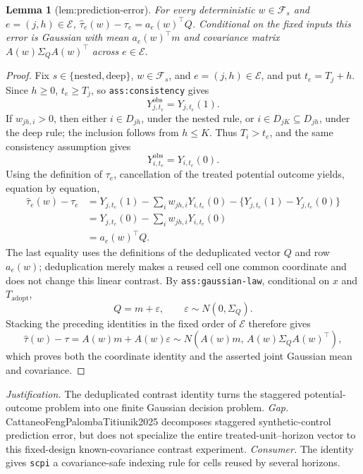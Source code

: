 \documentclass{article}
\newtheorem{lemma}{Lemma}
\begin{document}
\begin{lemma}[lem:prediction-error]\label{lem:prediction-error}
For every deterministic \(w\in\mathcal F_s\) and \(e=(j,h)\in\mathcal E\), \(\widehat\tau_e(w)-\tau_e=a_e(w)^{\top}Q\). Conditional on the fixed inputs this error is Gaussian with mean \(a_e(w)^{\top}m\) and covariance matrix \(A(w)\Sigma_QA(w)^{\top}\) across \(e\in\mathcal E\).
\end{lemma}
\begin{proof}
Fix \(s\in\{\mathrm{nested},\mathrm{deep}\}\), \(w\in\mathcal F_s\), and \(e=(j,h)\in\mathcal E\), and put \(t_e=T_j+h\).  Since \(h\geq 0\), \(t_e\geq T_j\), so \texttt{ass:consistency} gives
\[
Y^{\mathrm{obs}}_{j,t_e}=Y_{j,t_e}(1).
\]
If \(w_{jh,i}>0\), then either \(i\in D_{jh}\), under the nested rule, or \(i\in D_{jK}\subseteq D_{jh}\), under the deep rule; the inclusion follows from \(h\leq K\).  Thus \(T_i>t_e\), and the same consistency assumption gives
\[
Y^{\mathrm{obs}}_{i,t_e}=Y_{i,t_e}(0).
\]
Using the definition of \(\tau_e\), cancellation of the treated potential outcome yields, equation by equation,
\[
\begin{aligned}
\widehat\tau_e(w)-\tau_e
&=Y_{j,t_e}(1)-\sum_iw_{jh,i}Y_{i,t_e}(0)
  -\{Y_{j,t_e}(1)-Y_{j,t_e}(0)\}\\
&=Y_{j,t_e}(0)-\sum_iw_{jh,i}Y_{i,t_e}(0)\\
&=a_e(w)^{\top}Q.
\end{aligned}
\]
The last equality uses the definitions of the deduplicated vector \(Q\) and row \(a_e(w)\); deduplication merely makes a reused cell one common coordinate and does not change this linear contrast.  By \texttt{ass:gaussian-law}, conditional on \(x\) and \(T_{\mathrm{adopt}}\),
\[
Q=m+\varepsilon,\qquad \varepsilon\sim N(0,\Sigma_Q).
\]
Stacking the preceding identities in the fixed order of \(\mathcal E\) therefore gives
\[
\widehat\tau(w)-\tau=A(w)m+A(w)\varepsilon
\sim N\!\left(A(w)m,\,A(w)\Sigma_QA(w)^{\top}\right),
\]
which proves both the coordinate identity and the asserted joint Gaussian mean and covariance.
\end{proof}
\par\smallskip\noindent \textit{Justification.} The deduplicated contrast identity turns the staggered potential-outcome problem into one finite Gaussian decision problem. \textit{Gap.} CattaneoFengPalombaTitiunik2025 decomposes staggered synthetic-control prediction error, but does not specialize the entire treated-unit--horizon vector to this fixed-design known-covariance contrast experiment. \textit{Consumer.} The identity gives \texttt{scpi} a covariance-safe indexing rule for cells reused by several horizons.
\end{document}
